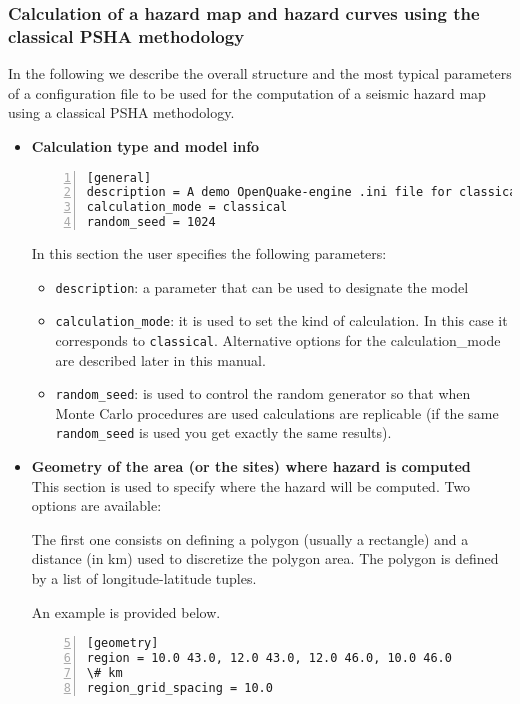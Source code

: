 \subsubsection[Calculation of a hazard map and hazard curves using 
    classical PSHA]{Calculation of a hazard map and hazard curves using 
    the classical PSHA methodology}
\label{sec:config_classical_PSHA}
%
In the following we describe the overall structure and the
most typical parameters of a configuration file to be used for the 
computation of a seismic hazard map using a classical PSHA methodology.
\begin{itemize}
\item \textbf{Calculation type and model info}
\begin{Verbatim}[frame=single, commandchars=\\\{\}, fontsize=\small,
    numbers=left, numbersep=2pt]
[general]
description = A demo OpenQuake-engine .ini file for classical PSHA
calculation_mode = classical
random_seed = 1024
\end{Verbatim}

In this section the user specifies the following parameters:
\begin{itemize}
    \item \texttt{description}: a parameter that can be used to designate 
        the model
    \item \texttt{calculation\_mode}: it is used to set the kind 
        of calculation. In this case it corresponds to \texttt{classical}.
        Alternative options for the calculation\_mode are described later in this manual.
    \item \texttt{random\_seed}: is used to control the random generator 
        so that when Monte Carlo procedures are used calculations are 
        replicable (if the same \texttt{random\_seed} is used you get 
        exactly the same results).
\end{itemize}
%
\item \textbf{Geometry of the area (or the sites) where hazard is computed}
    \hfill \\
This section is used to specify where the hazard will be computed. Two 
options are available:

The first one consists on defining a polygon 
(usually a rectangle) and a distance (in km) used to discretize the 
polygon area. The polygon is defined by a list of longitude-latitude tuples.

An example is provided below.
\begin{Verbatim}[frame=single, commandchars=\\\{\}, fontsize=\small,
    firstnumber=5, numbers=left, numbersep=2pt]
[geometry]
region = 10.0 43.0, 12.0 43.0, 12.0 46.0, 10.0 46.0
\# km
region_grid_spacing = 10.0
\end{Verbatim}


\end{itemize}
